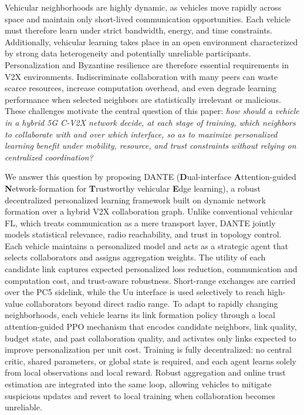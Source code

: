 Vehicular neighborhoods are highly dynamic, as vehicles move rapidly across space and maintain only short-lived communication opportunities. Each vehicle must therefore learn under strict bandwidth, energy, and time constraints. Additionally, vehicular learning takes place in an open environment characterized by strong data heterogeneity and potentially unreliable participants. Personalization and Byzantine resilience are therefore essential requirements in V2X environments. Indiscriminate collaboration with many peers can waste scarce resources, increase computation overhead, and even degrade learning performance when selected neighbors are statistically irrelevant or malicious. These challenges motivate the central question of this paper: \emph{how should a vehicle in a hybrid 5G C-V2X network decide, at each stage of training, which neighbors to collaborate with and over which interface, so as to maximize personalized learning benefit under mobility, resource, and trust constraints without relying on centralized coordination?}


We answer this question by proposing \textsc{DANTE} (\textbf{D}ual-interface \textbf{A}ttention-guided \textbf{N}etwork-formation for \textbf{T}rustworthy vehicular \textbf{E}dge learning), a robust decentralized personalized learning framework built on dynamic network formation over a hybrid V2X collaboration graph. Unlike conventional vehicular FL, which treats communication as a mere transport layer, DANTE jointly models statistical relevance, radio reachability, and trust in topology control. Each vehicle maintains a personalized model and acts as a strategic agent that selects collaborators and assigns aggregation weights. The utility of each candidate link captures expected personalized loss reduction, communication and computation cost, and trust-aware robustness. Short-range exchanges are carried over the PC5 sidelink, while the Uu interface is used selectively to reach high-value collaborators beyond direct radio range. To adapt to rapidly changing neighborhoods, each vehicle learns its link formation policy through a local attention-guided PPO mechanism that encodes candidate neighbors, link quality, budget state, and past collaboration quality, and activates only links expected to improve personalization per unit cost. Training is fully decentralized: no central critic, shared parameters, or global state is required, and each agent learns solely from local observations and local reward. Robust aggregation and online trust estimation are integrated into the same loop, allowing vehicles to mitigate suspicious updates and revert to local training when collaboration becomes unreliable.


